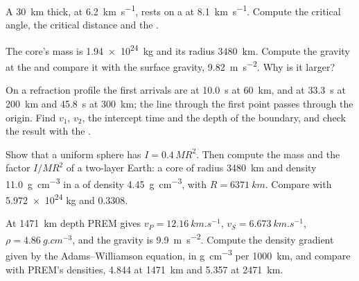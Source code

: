 \begin{exercise}[$\star$]\label{exo:b1:layered-earth:3}
A  \qty{30}{km} thick, at \qty{6.2}{km.s^{-1}}, rests on a  at
\qty{8.1}{km.s^{-1}}. Compute the critical angle, the critical distance and the
.
\end{exercise}

\begin{exercise}[$\star$]\label{exo:b1:layered-earth:4}
The core's mass is \qty{1.94e24}{kg} and its radius \qty{3480}{km}. Compute
the gravity at the  and compare it with the surface
gravity, \qty{9.82}{m.s^{-2}}. Why is it larger?
\end{exercise}

\begin{exercise}[$\star\star$]\label{exo:b1:layered-earth:5}
On a refraction profile the first arrivals are at \qty{10.0}{s} at
\qty{60}{km}, and at \qty{33.3}{s} at \qty{200}{km} and \qty{45.8}{s} at
\qty{300}{km}; the line through the first point passes through the origin.
Find $v_1$, $v_2$, the intercept time and the depth of the boundary, and check
the result with the .
\end{exercise}

\begin{exercise}[$\star\star$]\label{exo:b1:layered-earth:6}
Show that a uniform sphere has $I = 0.4\,MR^2$. Then compute the mass and the
factor $I/MR^2$ of a two-layer Earth: a core of radius \qty{3480}{km} and
density \qty{11.0}{g.cm^{-3}} in a  of density \qty{4.45}{g.cm^{-3}},
with $R = \qty{6371}{km}$. Compare with \num{5.972e24} kg and $0.3308$.
\end{exercise}

\begin{exercise}[$\star\star$]\label{exo:b1:layered-earth:7}
At \qty{1471}{km} depth PREM gives $v_P = \qty{12.16}{km.s^{-1}}$,
$v_S = \qty{6.673}{km.s^{-1}}$, $\rho = \qty{4.86}{g.cm^{-3}}$, and the gravity
is \qty{9.9}{m.s^{-2}}. Compute the density gradient given by the
Adams--Williamson equation, in \unit{g.cm^{-3}} per \qty{1000}{km}, and compare
with PREM's densities, \num{4.844} at \qty{1471}{km} and \num{5.357} at
\qty{2471}{km}.
\end{exercise}


